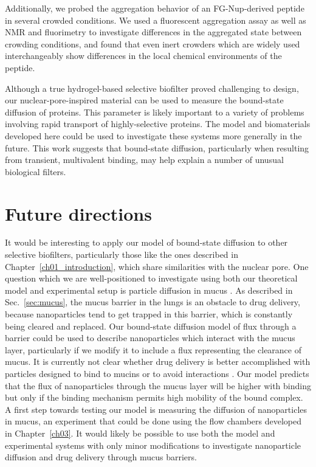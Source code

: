 Additionally, we probed the aggregation behavior of an FG-Nup-derived peptide in several crowded conditions.  We used a fluorescent aggregation assay as well as NMR and fluorimetry to investigate differences in the aggregated state between crowding conditions, and found that even inert crowders which are widely used interchangeably show differences in the local chemical environments of the peptide.

Although a true hydrogel-based selective biofilter proved challenging to design, our nuclear-pore-inspired material can be used to measure the bound-state diffusion of proteins.  This parameter is likely important to a variety of problems involving rapid transport of highly-selective proteins.  The model and biomaterials developed here could be used to investigate these systems more generally in the future.  This work suggests that bound-state diffusion, particularly when resulting from transient, multivalent binding, may help explain a number of unusual biological filters.

\section{Future directions}

It would be interesting to apply our model of bound-state diffusion to other selective biofilters, particularly those like the ones described in Chapter~\ref{ch01_introduction}, which share similarities with the nuclear pore.  One question which we are well-positioned to investigate using both our theoretical model and experimental setup is particle diffusion in mucus \cite{witten17,newby18}.  As described in Sec.~\ref{sec:mucus}, the mucus barrier in the lungs is an obstacle to drug delivery, because nanoparticles tend to get trapped in this barrier, which is constantly being cleared and replaced.  Our bound-state diffusion model of flux through a barrier could be used to describe nanoparticles which interact with the mucus layer, particularly if we modify it to include a flux representing the clearance of mucus.  It is currently not clear whether drug delivery is better accomplished with particles designed to bind to mucins or to avoid interactions \cite{schneider17,lai11}.  Our model predicts that the flux of nanoparticles through the mucus layer will be higher with binding but only if the binding mechanism permits high mobility of the bound complex.  A first step towards testing our model is measuring the diffusion of nanoparticles in mucus, an experiment that could be done using the flow chambers developed in Chapter~\ref{ch03}.  It would likely be possible to use both the model and experimental systems with only minor modifications to investigate nanoparticle diffusion and drug delivery through mucus barriers.

